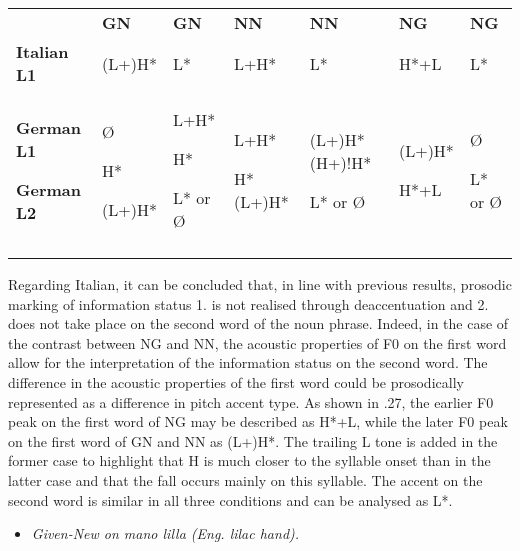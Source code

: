 \begin{tabularx}{\textwidth}{XXXXXXX}
 & \textbf{GN} & \textbf{GN} & \textbf{NN} & \textbf{NN} & \textbf{NG} & \textbf{NG}\\
\lsptoprule
\textbf{Italian} \textbf{L1} & (L+)H* & L* & L+H* & L* & H*+L & L*\\
\textbf{German} \textbf{L1}

\textbf{German} \textbf{L2} & Ø

H* 

(L+)H* & L+H*

H*

L* or Ø & L+H*

H* (L+)H* & (L+)H* (H+)!H*

L* or Ø & (L+)H*

H*+L & Ø

L* or Ø\\
\lspbottomrule
\end{tabularx}
Regarding Italian, it can be concluded that, in line with previous results, prosodic marking of information status 1. is not realised through deaccentuation and 2. does not take place on the second word of the noun phrase. Indeed, in the case of the contrast between NG and NN, the acoustic properties of F0 on the first word allow for the interpretation of the information status on the second word. The difference in the acoustic properties of the first word could be prosodically represented as a difference in pitch accent type. As shown in .27, the earlier F0 peak on the first word of NG may be described as H*+L, while the later F0 peak on the first word of GN and NN as (L+)H*. The trailing L tone is added in the former case to highlight that H is much closer to the syllable onset than in the latter case and that the fall occurs mainly on this syllable. The accent on the second word is similar in all three conditions and can be analysed as L*.

  
 

\begin{itemize}
\item \begin{styleListParagraph}
\textit{Given-New on mano lilla (Eng. lilac hand).} 
\end{styleListParagraph}
\end{itemize}

